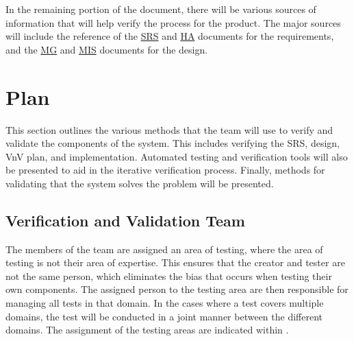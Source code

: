 \documentclass[12pt, titlepage]{article}
\begin{document}
In the remaining portion of the document, there will be various sources of information that will help verify the process for the product. The major sources will include the reference of the \href{https://github.com/icecap360/DroneCapstone/blob/master/docs/SRS/SRS.pdf}{SRS} and \href{https://github.com/icecap360/DroneCapstone/blob/master/docs/HazardAnalysis/HazardAnalysis.pdf}{HA} documents for the requirements, and the \href{https://github.com/icecap360/DroneCapstone/blob/master/docs/Design/MG/MG.pdf}{MG} and \href{https://github.com/icecap360/DroneCapstone/blob/master/docs/Design/MIS/MIS.pdf}{MIS} documents for the design.

\section{Plan}
\label{vnvPlan}

This section outlines the various methods that the team will use to verify and validate the components of the system. This includes verifying the SRS, design, VnV plan, and implementation. Automated testing and verification tools will also be presented to aid in the iterative verification process. Finally, methods for validating that the system solves the problem will be presented.

\subsection{Verification and Validation Team}

The members of the team are assigned an area of testing, where the area of testing is not their area of expertise. This ensures that the creator and tester are not the same person, which eliminates the bias that occurs when testing their own components. The assigned person to the testing area are then responsible for managing all tests in that domain. In the cases where a test covers multiple domains, the test will be conducted in a joint manner between the different domains. The assignment of the testing areas are indicated within .
  
\end{document}
